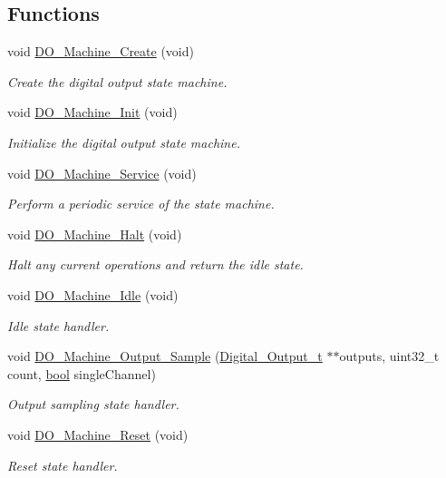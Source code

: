\subsection*{Functions}
\begin{DoxyCompactItemize}
\item 
void \hyperlink{group__do__statemachine_gaa65e663980860e8c565c42c90b0fc520}{D\-O\-\_\-\-Machine\-\_\-\-Create} (void)
\begin{DoxyCompactList}\small\item\em Create the digital output state machine. \end{DoxyCompactList}\item 
void \hyperlink{group__do__statemachine_ga989482cb42c01d19188c2551ac69abd2}{D\-O\-\_\-\-Machine\-\_\-\-Init} (void)
\begin{DoxyCompactList}\small\item\em Initialize the digital output state machine. \end{DoxyCompactList}\item 
void \hyperlink{group__do__statemachine_ga9b716c10660b0b05539ac2223c533f93}{D\-O\-\_\-\-Machine\-\_\-\-Service} (void)
\begin{DoxyCompactList}\small\item\em Perform a periodic service of the state machine. \end{DoxyCompactList}\item 
void \hyperlink{group__do__statemachine_ga9e56e4b7770bc82d5cd41fdd01bd4f7b}{D\-O\-\_\-\-Machine\-\_\-\-Halt} (void)
\begin{DoxyCompactList}\small\item\em Halt any current operations and return the idle state. \end{DoxyCompactList}\item 
void \hyperlink{group__do__statemachine_ga343b1742c0f79f1aa637f718ba61f6d5}{D\-O\-\_\-\-Machine\-\_\-\-Idle} (void)
\begin{DoxyCompactList}\small\item\em Idle state handler. \end{DoxyCompactList}\item 
void \hyperlink{group__do__statemachine_ga2314b594125edbaaac497a4466ac478a}{D\-O\-\_\-\-Machine\-\_\-\-Output\-\_\-\-Sample} (\hyperlink{struct_digital___output__t}{Digital\-\_\-\-Output\-\_\-t} $\ast$$\ast$outputs, uint32\-\_\-t count, \hyperlink{group__data__types_ga0ecf26b576b9a54eca656b9be7ba6a06}{bool} single\-Channel)
\begin{DoxyCompactList}\small\item\em Output sampling state handler. \end{DoxyCompactList}\item 
void \hyperlink{group__do__statemachine_ga3279edae8dde5bd486d1cfdd131de75c}{D\-O\-\_\-\-Machine\-\_\-\-Reset} (void)
\begin{DoxyCompactList}\small\item\em Reset state handler. \end{DoxyCompactList}\end{DoxyCompactItemize}


